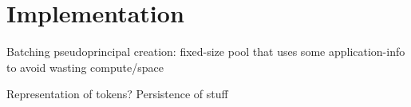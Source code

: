 \section{Implementation}
    
Batching pseudoprincipal creation: fixed-size pool that uses some application-info to avoid wasting
compute/space

Representation of tokens? Persistence of stuff

